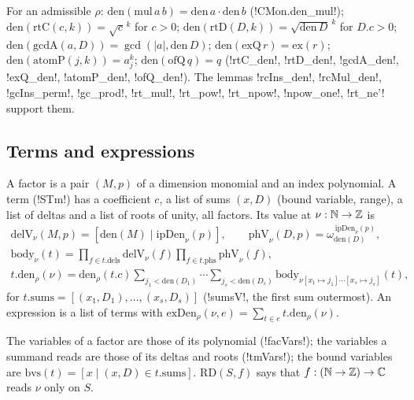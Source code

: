 \begin{proposition}
For an admissible $\rho$: $\mathrm{den}(\mathrm{mul}\,a\,b)=\mathrm{den}\,a\cdot\mathrm{den}\,b$ (\lean!CMon.den_mul!); $\mathrm{den}(\mathrm{rtC}(c,k))=\sqrt c^{\,k}$ for $c>0$; $\mathrm{den}(\mathrm{rtD}(D,k))=\sqrt{\mathrm{den}\,D}^{\,k}$ for $D.c>0$; $\mathrm{den}(\mathrm{gcdA}(a,D))=\gcd(|a|,\mathrm{den}\,D)$; $\mathrm{den}(\mathrm{exQ}\,r)=\mathrm{ex}(r)$; $\mathrm{den}(\mathrm{atomP}(j,k))=a_j^k$; $\mathrm{den}(\mathrm{ofQ}\,q)=q$ (\lean!rtC_den!, \lean!rtD_den!, \lean!gcdA_den!, \lean!exQ_den!, \lean!atomP_den!, \lean!ofQ_den!). The lemmas \lean!rcIns_den!, \lean!rcMul_den!, \lean!gcIns_perm!, \lean!gc_prod!, \lean!rt_mul!, \lean!rt_pow!, \lean!rt_npow!, \lean!npow_one!, \lean!rt_ne'! support them.
\end{proposition}

\subsection{Terms and expressions}

\begin{definition}\label{def:lean-sym-stm}
A factor is a pair $(M,p)$ of a dimension monomial and an index polynomial. A term (\lean!STm!) has a coefficient $c$, a list of sums $(x,D)$ (bound variable, range), a list of deltas and a list of roots of unity, all factors. Its value at $\nu:\mathbb{N}\to\mathbb{Z}$ is
\begin{gather*}
\mathrm{delV}_\nu(M,p)=[\mathrm{den}(M)\mid\mathrm{ipDen}_\nu(p)],\qquad \mathrm{phV}_\nu(D,p)=\omega_{\mathrm{den}(D)}^{\,\mathrm{ipDen}_\nu(p)},\\
\mathrm{body}_\nu(t)=\prod_{f\in t.\mathrm{dels}}\mathrm{delV}_\nu(f)\prod_{f\in t.\mathrm{phs}}\mathrm{phV}_\nu(f),\\
t.\mathrm{den}_\rho(\nu)=\mathrm{den}_\rho(t.c)\sum_{j_1<\mathrm{den}(D_1)}\cdots\sum_{j_s<\mathrm{den}(D_s)}\mathrm{body}_{\nu[x_1\mapsto j_1]\cdots[x_s\mapsto j_s]}(t),
\end{gather*}
for $t.\mathrm{sums}=[(x_1,D_1),\dots,(x_s,D_s)]$ (\lean!sumsV!, the first sum outermost). An expression is a list of terms with $\mathrm{exDen}_\rho(\nu,e)=\sum_{t\in e}t.\mathrm{den}_\rho(\nu)$.
\end{definition}

The variables of a factor are those of its polynomial (\lean!facVars!); the variables a summand reads are those of its deltas and roots (\lean!tmVars!); the bound variables are $\mathrm{bvs}(t)=[x\mid(x,D)\in t.\mathrm{sums}]$. $\mathrm{RD}(S,f)$ says that $f:(\mathbb{N}\to\mathbb{Z})\to\mathbb{C}$ reads $\nu$ only on $S$.


